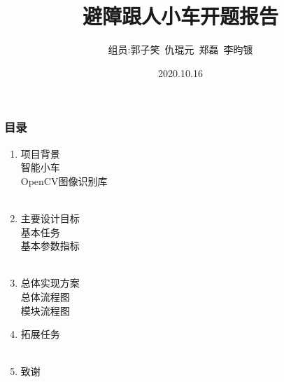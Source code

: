 \documentclass[cjk]{beamer}
\title{避障跟人小车\quad 开题报告}
\author{组员:郭子笑\ 仇琨元\ 郑磊\ 李昀镀}%
\date{\footnotesize \vspace{5mm}2020.10.16}
\begin{document}

    \begin{frame} %

        \titlepage

    \end{frame}

    \begin{frame}
     \frametitle{目录}
     \begin{enumerate}
\normalsize

     \item 项目背景\\
智能小车\\
OpenCV图像识别库\\
     \qquad\\
     \item 主要设计目标\\
基本任务\\
基本参数指标\\
     \qquad\\
     \item 总体实现方案\\
总体流程图\\
模块流程图\\
     \qquad
     \item 拓展任务\\
     \qquad\\
 \item 致谢\\
     \end{enumerate}
    \end{frame}
\end{document}
